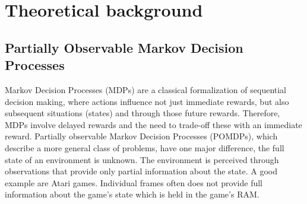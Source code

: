 \section{Theoretical background}

\subsection{Partially Observable Markov Decision Processes}

Markov Decision Processes (MDPs) are a classical formalization of sequential decision making, where actions influence not just immediate rewards, but also subsequent situations (states) and through those future rewards. Therefore, MDPs involve delayed rewards and the need to trade-off these with an immediate reward.
Partially observable Markov Decision Processes (POMDPs), which describe a more general class of problems, have one major difference, the full state of an environment is unknown. The environment is perceived through observations that provide only partial information about the state. A good example are Atari games. Individual frames often does not provide full information about the game's state which is held in the game's RAM.

